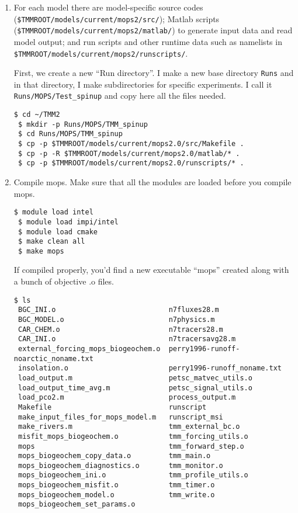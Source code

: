 \documentclass[a4paper]{article}
\def\noin{\noindent }
\begin{document}
\begin{enumerate}
\item For each model there are model-specific source codes \\ (\verb|$TMMROOT/models/current/mops2/src/|); Matlab scripts \\ (\verb|$TMMROOT/models/current/mops2/matlab/|) to generate input data and read model output; and run scripts and other runtime data such as namelists in \\ 
\verb|$TMMROOT/models/current/mops2/runscripts/|. 

First, we create a new ``Run directory''. I make a new base directory \verb|Runs| and in that directory, I make subdirectories for specific experiments. I call it \verb|Runs/MOPS/Test_spinup| and copy here all the files needed.

\begin{lstlisting}[style=DOS]
 $ cd ~/TMM2
 $ mkdir -p Runs/MOPS/TMM_spinup
 $ cd Runs/MOPS/TMM_spinup
 $ cp -p $TMMROOT/models/current/mops2.0/src/Makefile .
 $ cp -p -R $TMMROOT/models/current/mops2.0/matlab/* .
 $ cp -p $TMMROOT/models/current/mops2.0/runscripts/* .
\end{lstlisting}

\item Compile mops. Make sure that all the modules are loaded before you compile mops.
\begin{lstlisting}[style=DOS]
 $ module load intel
 $ module load impi/intel
 $ module load cmake
 $ make clean all
 $ make mops
\end{lstlisting}

\noin If compiled properly, you'd find a new executable ``mops'' created along with a bunch of objective .o files. 
\begin{lstlisting}[style=DOS]
 $ ls
 BGC_INI.o                           n7fluxes28.m
 BGC_MODEL.o                         n7physics.m
 CAR_CHEM.o                          n7tracers28.m
 CAR_INI.o                           n7tracersavg28.m
 external_forcing_mops_biogeochem.o  perry1996-runoff-noarctic_noname.txt
 insolation.o                        perry1996-runoff_noname.txt
 load_output.m                       petsc_matvec_utils.o
 load_output_time_avg.m              petsc_signal_utils.o
 load_pco2.m                         process_output.m
 Makefile                            runscript
 make_input_files_for_mops_model.m   runscript_msi
 make_rivers.m                       tmm_external_bc.o
 misfit_mops_biogeochem.o            tmm_forcing_utils.o
 mops                                tmm_forward_step.o
 mops_biogeochem_copy_data.o         tmm_main.o
 mops_biogeochem_diagnostics.o       tmm_monitor.o
 mops_biogeochem_ini.o               tmm_profile_utils.o
 mops_biogeochem_misfit.o            tmm_timer.o
 mops_biogeochem_model.o             tmm_write.o
 mops_biogeochem_set_params.o
\end{lstlisting}


\end{enumerate}
\end{document}
